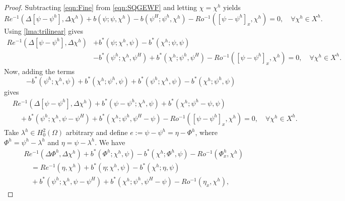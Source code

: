 \begin{proof}
  Subtracting \eqref{eqn:Fine} from \eqref{eqn:SQGEWF} and letting $\chi=\chi^h$
  yields
  \begin{equation*}
    Re^{-1} (\Delta \left[\psi - \psi^h\right], \Delta \chi^h) + b(\psi;\psi,\chi^h)
      - b(\psi^H;\psi^h,\chi^h) - Ro^{-1} (\left[\psi-\psi^h\right]_x,\chi^h)
      = 0, \quad \forall \chi^h \in X^h.
  \end{equation*}
  Using \autoref{lma:trilinear} gives
  \begin{equation*}
    \begin{split}
      Re^{-1} (\Delta \left[\psi - \psi^h\right], \Delta \chi^h)
        &+ b^*(\psi;\chi^h, \psi) - b^*(\chi^h;\psi,\psi) \\
      &- b^*(\psi^h;\chi^h,\psi^H) + b^*(\chi^h; \psi^h,\psi^H)
        - Ro^{-1} (\left[\psi-\psi^h\right]_x,\chi^h) = 0,
      \quad \forall \chi^h \in X^h.
    \end{split}
  \end{equation*}
  Now, adding the terms
  \begin{equation*}
    -b^*(\psi^h;\chi^h,\psi) + b^*(\chi^h;\psi^h,\psi) + b^*(\psi^h;\chi^h,\psi) - b^*(\chi^h;\psi^h,\psi)
  \end{equation*}
  gives
  \begin{equation*}
    \begin{split}
      &Re^{-1} (\Delta \left[\psi - \psi^h\right], \Delta \chi^h)
        + b^*(\psi-\psi^h;\chi^h, \psi) + b^*(\chi^h;\psi^h-\psi,\psi) \\
      &\quad+ b^*(\psi^h;\chi^h,\psi-\psi^H) + b^*(\chi^h; \psi^h,\psi^H-\psi)
        - Ro^{-1} (\left[\psi-\psi^h\right]_x,\chi^h) = 0,
    \quad \forall \chi^h \in X^h.
      \end{split}
  \end{equation*}
  Take $\lambda^h\in H^2_0(\Omega)$ arbitrary and define $e:= \psi - \psi^h =
  \eta - \Phi^h$, where $\Phi^h = \psi^h-\lambda^h$ and $\eta=\psi-\lambda^h$.
  We have
  \begin{equation*}
    \begin{split}
      &Re^{-1}(\Delta \Phi^h, \Delta \chi^h)
        + b^*(\Phi^h;\chi^h, \psi) - b^*(\chi^h;\Phi^h,\psi)
        - Ro^{-1} (\Phi^h_x,\chi^h) \\
      &\quad = Re^{-1} (\eta,\chi^h)
        + b^*(\eta;\chi^h, \psi) - b^*(\chi^h;\eta,\psi) \\
      &\quad+ b^*(\psi^h;\chi^h,\psi-\psi^H) + b^*(\chi^h; \psi^h,\psi^H-\psi)
        - Ro^{-1} (\eta_x,\chi^h),

\end{split}
\end{equation*}
\end{proof}
